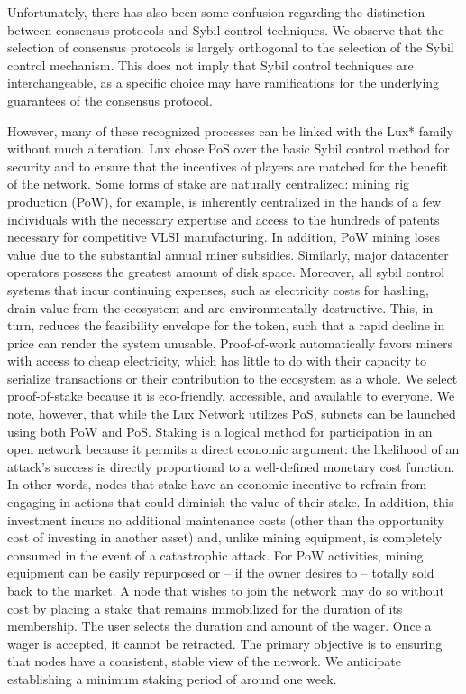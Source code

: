 \documentclass[11pt]{article}
\begin{document}
Unfortunately, there has also been some confusion regarding the distinction between consensus protocols and Sybil control techniques. We observe that the selection of consensus protocols is largely orthogonal to the selection of the Sybil control mechanism. This does not imply that Sybil control techniques are interchangeable, as a specific choice may have ramifications for the underlying guarantees of the consensus protocol.


However, many of these recognized processes can be linked with the Lux* family without much alteration. Lux chose PoS over the basic Sybil control method for security and to ensure that the incentives of players are matched for the benefit of the network. Some forms of stake are naturally centralized: mining rig production (PoW), for example, is inherently centralized in the hands of a few individuals with the necessary expertise and access to the hundreds of patents necessary for competitive VLSI manufacturing. In addition, PoW mining loses value due to the substantial annual miner subsidies. Similarly, major datacenter operators possess the greatest amount of disk space. Moreover, all sybil control systems that incur continuing expenses, such as electricity costs for hashing, drain value from the ecosystem and are environmentally destructive. This, in turn, reduces the feasibility envelope for the token, such that a rapid decline in price can render the system unusable. Proof-of-work automatically favors miners with access to cheap electricity, which has little to do with their capacity to serialize transactions or their contribution to the ecosystem as a whole. We select proof-of-stake because it is eco-friendly, accessible, and available to everyone. We note, however, that while the Lux Network utilizes PoS, subnets can be launched using both PoW and PoS. Staking is a logical method for participation in an open network because it permits a direct economic argument: the likelihood of an attack's success is directly proportional to a well-defined monetary cost function. In other words, nodes that stake have an economic incentive to refrain from engaging in actions that could diminish the value of their stake. In addition, this investment incurs no additional maintenance costs (other than the opportunity cost of investing in another asset) and, unlike mining equipment, is completely consumed in the event of a catastrophic attack. For PoW activities, mining equipment can be easily repurposed or -- if the owner desires to -- totally sold back to the market. A node that wishes to join the network may do so without cost by placing a stake that remains immobilized for the duration of its membership. The user selects the duration and amount of the wager. Once a wager is accepted, it cannot be retracted. The primary objective is to ensuring that nodes have a consistent, stable view of the network. We anticipate establishing a minimum staking period of around one week.
\end{document}

